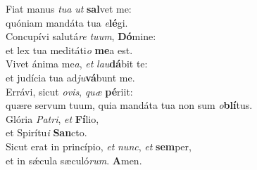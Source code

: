 \oddverse Fiat manus \textit{tu}\textit{a} \textit{ut} \textbf{sal}vet me:~\*\\
\oddverse quóniam mandáta tua \textit{e}\textbf{lé}gi.\\
\evenverse Concupívi salutá\textit{re} \textit{tu}\textit{um}, \textbf{Dó}mine:~\*\\
\evenverse et lex tua meditáti\textit{o} \textbf{me}a est.\\
\oddverse Vivet ánima me\textit{a}, \textit{et} \textit{lau}\textbf{dá}bit te:~\*\\
\oddverse et judícia tua ad\textit{ju}\textbf{vá}bunt me.\\
\evenverse Errávi, sicut \textit{o}\textit{vis}, \textit{quæ} \textbf{pé}riit:~\*\\
\evenverse quære servum tuum, quia mandáta tua non sum \textit{o}\textbf{blí}tus.\\
\oddverse Glória \textit{Pa}\textit{tri}, \textit{et} \textbf{Fí}lio,~\*\\
\oddverse et Spirítu\textit{i} \textbf{San}cto.\\
\evenverse Sicut erat in princípio, \textit{et} \textit{nunc}, \textit{et} \textbf{sem}per,~\*\\
\evenverse et in sǽcula sæculó\textit{rum}. \textbf{A}men.\\

